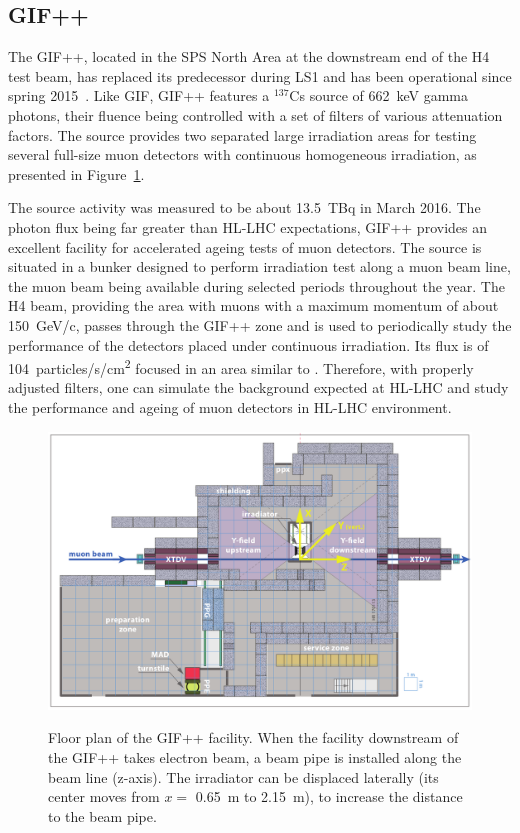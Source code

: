 		\subsection{GIF++}
		\label{chapt5:ssec:GIF++}
		
	The \acf{GIF++}, located in the SPS North Area at the downstream end of the H4 test beam, has replaced its predecessor during LS1 and has been operational since spring 2015~\cite{JAKEL2014}. Like GIF, GIF++ features a $^{137}$Cs source of \SI{662}{keV} gamma photons, their fluence being controlled with a set of filters of various attenuation factors. The source provides two separated large irradiation areas for testing several full-size muon detectors with continuous homogeneous irradiation, as presented in Figure~\ref{fig:GIFpp-Layout}.
	
	 The source activity was measured to be about \SI{13.5}{TBq} in March 2016. The photon flux being far greater than HL-LHC expectations, GIF++ provides an excellent facility for accelerated ageing tests of muon detectors. The source is situated in a bunker designed to perform irradiation test along a muon beam line, the muon beam being available during selected periods throughout the year. The H4 beam, providing the area with muons with a maximum momentum of about \SI{150}{GeV/c}, passes through the GIF++ zone and is used to periodically study the performance of the detectors placed under continuous irradiation. Its flux is of \SI{104}{particles/s/\square\cm} focused in an area similar to . Therefore, with properly adjusted filters, one can simulate the background expected at HL-LHC and study the performance and ageing of muon detectors in HL-LHC environment.\\
	
	\begin{figure}[H]
		\centering
		\includegraphics[width = 0.8\plotwidth]{fig/chapt5/GIFpp-Layout.png}\\
		\caption{\label{fig:GIFpp-Layout} Floor plan of the GIF++ facility. When the facility downstream of the GIF++ takes electron beam, a beam pipe is installed along the beam line (z-axis). The irradiator can be displaced laterally (its center moves from $x=$ \SI{0.65}{m} to \SI{2.15}{m}), to increase the distance to the beam pipe.}
	\end{figure}
	 
